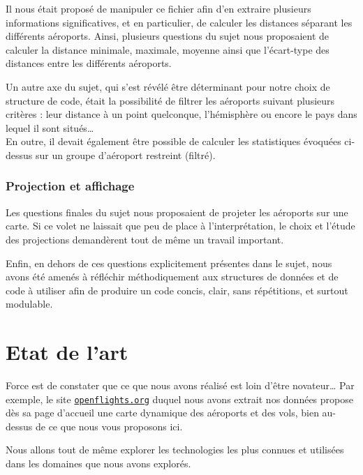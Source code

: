 \documentclass[a4paper, 12pt]{report}
\begin{document}
Il nous était proposé de manipuler ce fichier afin d'en extraire plusieurs informations significatives, et en particulier, de calculer les distances séparant les différents aéroports. Ainsi, plusieurs questions du sujet nous proposaient de calculer la distance minimale, maximale, moyenne ainsi que l'écart-type des distances entre les différents aéroports.

Un autre axe du sujet, qui s'est révélé être déterminant pour notre choix de structure de code, était la possibilité de filtrer les aéroports suivant plusieurs critères : leur distance à un point quelconque, l'hémisphère ou encore le pays dans lequel il sont situés\ldots{}\\
En outre, il devait également être possible de calculer les statistiques évoquées ci-dessus sur un groupe d'aéroport restreint (filtré).

\subsection{Projection et affichage}

Les questions finales du sujet nous proposaient de projeter les aéroports sur une carte. Si ce volet ne laissait que peu de place à l'interprétation, le choix et l'étude des projections demandèrent tout de même un travail important.

Enfin, en dehors de ces questions explicitement présentes dans le sujet, nous avons été amenés à réfléchir méthodiquement aux structures de données et de code à utiliser afin de produire un code concis, clair, sans répétitions, et surtout modulable.


\chapter{Etat de l'art}

Force est de constater que ce que nous avons réalisé est loin d'être novateur\ldots{} Par exemple, le site \href{https://openflights.org}{\tt{openflights.org}} duquel nous avons extrait nos données propose dès sa page d'accueil une carte dynamique des aéroports et des vols, bien au-dessus de ce que nous vous proposons ici.

Nous allons tout de même explorer les technologies les plus connues et utilisées dans les domaines que nous avons explorés.
\end{document}
